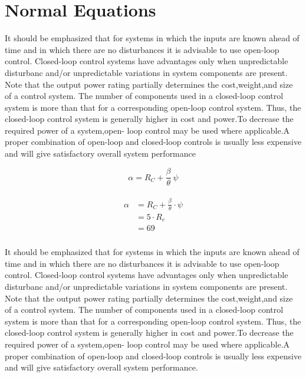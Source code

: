 \documentclass{report}
\begin{document}
\chapter{Normal Equations}

It should be emphasized that for systems in which the inputs are known ahead of time and in which there are no disturbances it is advisable to use open-loop control.  Closed-loop control systems have advantages only when unpredictable disturbanc and/or unpredictable variations in system components are present. Note that the  output power rating partially determines the cost,weight,and size of a control system.  The number of components used in a closed-loop control system is more than that for  a corresponding open-loop control system. Thus, the closed-loop control system is  generally higher in cost and power.To decrease the required power of a system,open-  loop control may be used where applicable.A proper combination of open-loop and  closed-loop controls is usually less expensive and will give satisfactory overall system  performance

\begin{equation}
\alpha=R_{C} + \frac{\beta_{}}{\theta} \, \psi
\end{equation}

\begin{align}
\begin{split}
\alpha &= R_{C} + \frac{\beta_{}}{\theta} \cdot \psi\\
 &= 5 \cdot R_{c}\\
 &= 69\\
\end{split}
\end{align}

It should be emphasized that for systems in which the inputs are known ahead of time and in which there are no disturbances it is advisable to use open-loop control.  Closed-loop control systems have advantages only when unpredictable disturbanc and/or unpredictable variations in system components are present. Note that the  output power rating partially determines the cost,weight,and size of a control system.  The number of components used in a closed-loop control system is more than that for  a corresponding open-loop control system. Thus, the closed-loop control system is  generally higher in cost and power.To decrease the required power of a system,open-  loop control may be used where applicable.A proper combination of open-loop and  closed-loop controls is usually less expensive and will give satisfactory overall system  performance.
\end{document}
